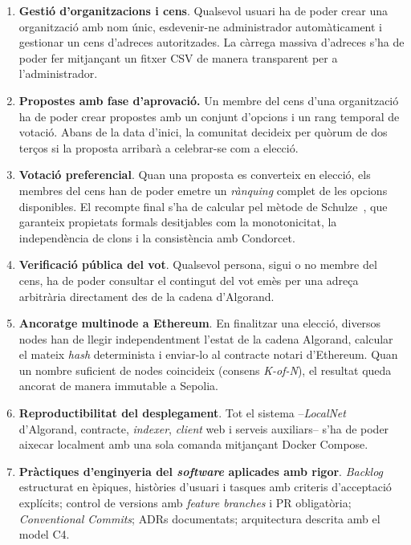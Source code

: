 \begin{enumerate}
    \item \textbf{Gestió d'organitzacions i cens}.
    Qualsevol usuari ha de poder crear una organització amb nom únic, esdevenir-ne administrador automàticament i
    gestionar un cens d'adreces autoritzades.
    La càrrega massiva d'adreces s'ha de poder fer mitjançant un fitxer \ac{CSV} de manera transparent per a
    l'administrador.

    \item \textbf{Propostes amb fase d'aprovació.} Un membre del cens d'una organització ha de poder crear propostes amb
    un conjunt d'opcions i un rang temporal de votació.
    Abans de la data d'inici, la comunitat decideix per quòrum de dos terços si la proposta arribarà a celebrar-se com a
    elecció.

    \item \textbf{Votació preferencial}.
    Quan una proposta es converteix en elecció, els membres del cens han de poder emetre un \emph{rànquing} complet de
    les opcions disponibles.
    El recompte final s'ha de calcular pel mètode de Schulze~\cite{schulze2011newmethod}, que garanteix propietats
    formals desitjables com la monotonicitat, la independència de clons i la consistència amb Condorcet.

    \item \textbf{Verificació pública del vot}.
    Qualsevol persona, sigui o no membre del cens, ha de poder consultar el contingut del vot emès per una adreça
    arbitrària directament des de la cadena d'Algorand.

    \item \textbf{Ancoratge multinode a Ethereum}.
    En finalitzar una elecció, diversos nodes han de llegir independentment l'estat de la cadena Algorand, calcular el
    mateix \emph{\textit{hash}} determinista i enviar-lo al contracte notari d'Ethereum.
    Quan un nombre suficient de nodes coincideix (consens \textit{K-of-N}), el resultat queda ancorat de manera
    immutable a Sepolia.

    \item \textbf{Reproductibilitat del desplegament}.
    Tot el sistema --\emph{LocalNet} d'Algorand, contracte, \emph{indexer}, \emph{client} web i serveis auxiliars-- s'ha
    de poder aixecar localment amb una sola comanda mitjançant Docker Compose.

    \item \textbf{Pràctiques d'enginyeria del \textit{software} aplicades amb rigor}.
    \emph{Backlog} estructurat en èpiques, històries d'usuari i tasques amb criteris d'acceptació explícits; control de
    versions amb \emph{feature branches} i \ac{PR} obligatòria; \emph{Conventional Commits}; \acp{ADR} documentats;
    arquitectura descrita amb el model C4.
\end{enumerate}

